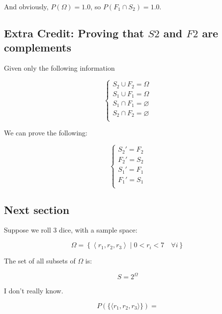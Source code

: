 \documentclass{article}
\begin{document}
And obviously, $P(\Omega)=1.0$, so $P(F_1\cap{}S_2)=1.0$.

\subsection*{Extra Credit: Proving that $S2$ and $F2$ are complements}

Given only the following information

\[
\begin{cases}
S_2\cup F_2=\Omega \\
S_1\cup F_1=\Omega \\
S_1\cap F_1=\varnothing \\
S_2\cap F_2=\varnothing \\
\end{cases}
\]

We can prove the following:

\[
\begin{cases}
S_2'=F_2 \\
F_2'=S_2 \\
S_1'=F_1 \\
F_1'=S_1 \\
\end{cases}
\]

\subsection*{Next section}

Suppose we roll 3 dice, with a sample space:

\[
\Omega=\left\{\left\langle r_1, r_2, r_3\right\rangle\mid 0<r_i<7\quad\forall i\right\}
\]

The set of all subsets of $\Omega$ is:

\[
S = 2^\Omega
\]

I don't really know.

\[
P(\{\langle r_1, r_2, r_3\rangle\})=
\]
\end{document}
